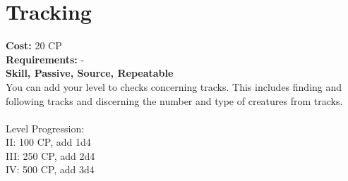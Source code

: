 \section{Tracking}
\textbf{Cost:} 20 CP\\
\textbf{Requirements:} -\\
\textbf{Skill, Passive, Source, Repeatable}\\
You can add your level to checks concerning tracks. This includes finding and following tracks and discerning the number and type of creatures from tracks.\\
\\
Level Progression:\\
II: 100 CP, add 1d4\\
III: 250 CP, add 2d4\\
IV: 500 CP, add 3d4\\